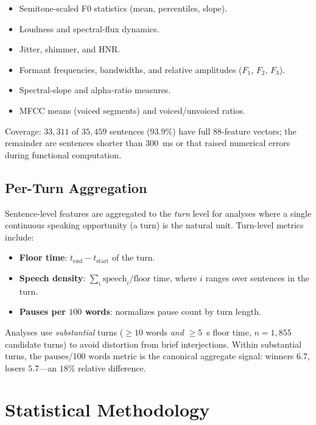 \documentclass[journal]{IEEEtran}
\begin{document}
\begin{itemize}
  \item Semitone-scaled F0 statistics (mean, percentiles, slope).
  \item Loudness and spectral-flux dynamics.
  \item Jitter, shimmer, and HNR.
  \item Formant frequencies, bandwidths, and relative amplitudes
        ($F_1$, $F_2$, $F_3$).
  \item Spectral-slope and alpha-ratio measures.
  \item MFCC means (voiced segments) and voiced/unvoiced ratios.
\end{itemize}

Coverage: $33{,}311$ of $35{,}459$ sentences ($93.9\%$) have full
$88$-feature vectors; the remainder are sentences shorter than
$300$~ms or that raised numerical errors during functional
computation.

\subsection{Per-Turn Aggregation}
Sentence-level features are aggregated to the \emph{turn} level for
analyses where a single continuous speaking opportunity (a turn) is
the natural unit. Turn-level metrics include:

\begin{itemize}
  \item \textbf{Floor time}: $t_{\text{end}} - t_{\text{start}}$ of
        the turn.
  \item \textbf{Speech density}: $\sum_i \text{speech}_i /
        \text{floor time}$, where $i$ ranges over sentences in the
        turn.
  \item \textbf{Pauses per $100$ words}: normalizes pause count by
        turn length.
\end{itemize}

Analyses use \emph{substantial} turns
($\geq 10$ words \emph{and} $\geq 5$~s floor time, $n=1{,}855$
candidate turns) to avoid distortion from brief
interjections. Within substantial turns, the
$\text{pauses/100~words}$ metric is the canonical aggregate signal:
winners $6.7$, losers $5.7$---an $18\%$ relative difference.

\section{Statistical Methodology}
\label{sec:method}
\end{document}
